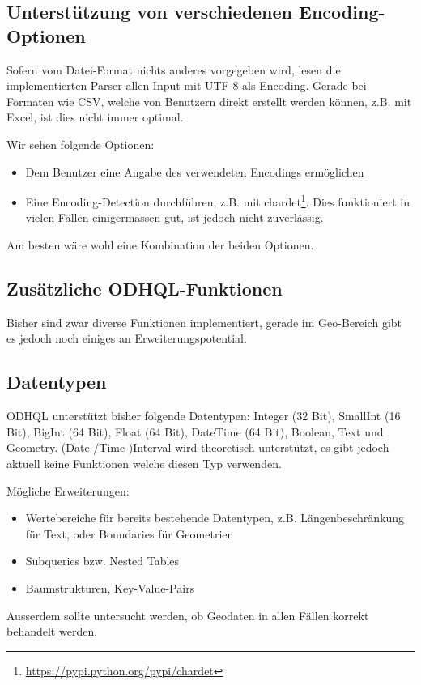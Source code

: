 \subsection{Unterstützung von verschiedenen Encoding-Optionen}
Sofern vom Datei-Format nichts anderes vorgegeben wird, lesen die implementierten Parser allen Input mit UTF-8 als Encoding. Gerade bei Formaten wie CSV, welche von Benutzern direkt erstellt werden können, z.B. mit Excel, ist dies nicht immer optimal.

Wir sehen folgende Optionen:
\begin{itemize}
\item Dem Benutzer eine Angabe des verwendeten Encodings ermöglichen
\item Eine Encoding-Detection durchführen, z.B. mit chardet\footnote{\url{https://pypi.python.org/pypi/chardet}}. Dies funktioniert in vielen Fällen einigermassen gut, ist jedoch nicht zuverlässig.
\end{itemize}

Am besten wäre wohl eine Kombination der beiden Optionen.

\subsection{Zusätzliche ODHQL-Funktionen}
Bisher sind zwar diverse Funktionen implementiert, gerade im Geo-Bereich gibt es jedoch noch einiges an Erweiterungspotential.

\subsection{Datentypen}
ODHQL unterstützt bisher folgende Datentypen: Integer (32 Bit), SmallInt (16 Bit), BigInt (64 Bit), Float (64 Bit), DateTime (64 Bit), Boolean, Text und Geometry. (Date-/Time-)Interval wird theoretisch unterstützt, es gibt jedoch aktuell keine Funktionen welche diesen Typ verwenden.

Mögliche Erweiterungen:
\begin{itemize}
\item Wertebereiche für bereits bestehende Datentypen, z.B. Längenbeschränkung für Text, oder Boundaries für Geometrien
\item Subqueries bzw. Nested Tables
\item Baumstrukturen, Key-Value-Pairs
\end{itemize}

Ausserdem sollte untersucht werden, ob Geodaten in allen Fällen korrekt behandelt werden.

